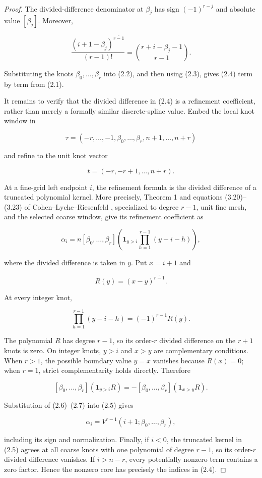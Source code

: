\documentclass[11pt]{article}
\begin{document}
\begin{proof}

The divided-difference denominator at $\beta_j$ has sign $(-1)^{r-j}$ and absolute value
$[\beta_j]$. Moreover,

\[
\frac{(i+1-\beta_j)^{\overline{r-1}}}{(r-1)!}
=\binom{r+i-\beta_j-1}{r-1}.
\]

Substituting the knots $\beta_0,\ldots,\beta_r$ into (2.2), and then using (2.3), gives (2.4)
term by term from (2.1).

It remains to verify that the divided difference in (2.4) is a refinement coefficient, rather than
merely a formally similar discrete-spline value. Embed the local knot window in

\[
\tau=(-r,\ldots,-1,\beta_0,\ldots,\beta_r,n+1,\ldots,n+r)
\]

and refine to the unit knot vector

\[
t=(-r,-r+1,\ldots,n+r).
\]

At a fine-grid left endpoint $i$, the refinement formula is the divided difference of a truncated
polynomial kernel. More precisely, Theorem 1 and equations (3.20)--(3.23) of
Cohen--Lyche--Riesenfeld \cite{cohen-lyche-riesenfeld}, specialized to degree $r-1$, unit fine mesh, and the selected coarse
window, give its refinement coefficient as

\[
\alpha_i
=n[\beta_0,\ldots,\beta_r]
\left(
\mathbf1_{y>i}\prod_{h=1}^{r-1}(y-i-h)
\right),
\tag{2.5}
\]

where the divided difference is taken in $y$. Put $x=i+1$ and

\[
R(y)=(x-y)^{\overline{r-1}}.
\]

At every integer knot,

\[
\prod_{h=1}^{r-1}(y-i-h)=(-1)^{r-1}R(y).
\tag{2.6}
\]

The polynomial $R$ has degree $r-1$, so its order-$r$ divided difference on the $r+1$ knots is
zero. On integer knots, $y>i$ and $x>y$ are complementary conditions. When $r>1$, the possible
boundary value $y=x$ vanishes because $R(x)=0$; when $r=1$, strict complementarity holds directly.
Therefore

\[
[\beta_0,\ldots,\beta_r](\mathbf1_{y>i}R)
=-[\beta_0,\ldots,\beta_r](\mathbf1_{x>y}R).
\tag{2.7}
\]

Substitution of (2.6)--(2.7) into (2.5) gives

\[
\alpha_i=V^{r-1}(i+1;\beta_0,\ldots,\beta_r),
\]

including its sign and normalization. Finally, if $i<0$, the truncated kernel in (2.5) agrees at
all coarse knots with one polynomial of degree $r-1$, so its order-$r$ divided difference vanishes.
If $i>n-r$, every potentially nonzero term contains a zero factor. Hence the nonzero core has
precisely the indices in (2.4).
\end{proof}
\end{document}
